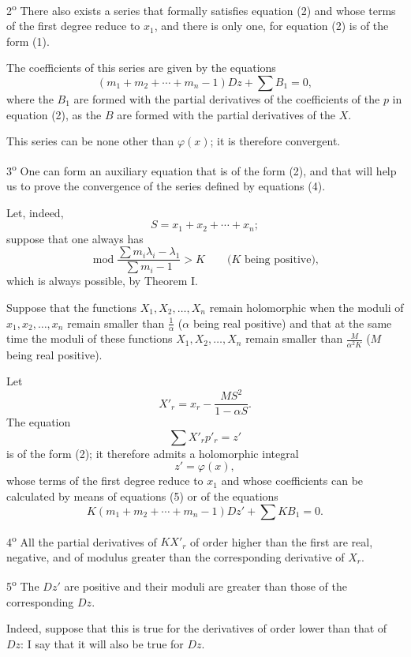 \documentclass[11pt]{article}
\begin{document}
2\textsuperscript{o} There also exists a series that formally satisfies equation (2) and whose terms of the first degree reduce to $x_1$, and there is only one, for equation (2) is of the form (1).

The coefficients of this series are given by the equations
\begin{equation*}\tag{5}
(m_1+m_2+\cdots+m_n-1)Dz+\sum B_1=0,
\end{equation*}
where the $B_1$ are formed with the partial derivatives of the coefficients of the $p$ in equation (2), as the $B$ are formed with the partial derivatives of the $X$.

This series can be none other than $\varphi(x)$; it is therefore convergent.

3\textsuperscript{o} One can form an auxiliary equation that is of the form (2), and that will help us to prove the convergence of the series defined by equations (4).

Let, indeed,
\[
S=x_1+x_2+\cdots+x_n;
\]
suppose that one always has
\[
\operatorname{mod}\frac{\sum m_i\lambda_i-\lambda_1}{\sum m_i-1}>K
\qquad\text{($K$ being positive)},
\]
which is always possible, by Theorem I.

Suppose that the functions $X_1,X_2,\ldots,X_n$ remain holomorphic when the moduli of $x_1,x_2,\ldots,x_n$ remain smaller than $\frac1\alpha$ ($\alpha$ being real positive) and that at the same time the moduli of these functions $X_1,X_2,\ldots,X_n$ remain smaller than $\frac{M}{\alpha^2K}$ ($M$ being real positive).

Let
\[
X'_r=x_r-\frac{MS^2}{1-\alpha S}.
\]
The equation
\[
\sum X'_rp'_r=z'
\]
is of the form (2); it therefore admits a holomorphic integral
\[
z'=\varphi(x),
\]
whose terms of the first degree reduce to $x_1$ and whose coefficients can be calculated by means of equations (5) or of the equations
\begin{equation*}\tag{5 bis}
K(m_1+m_2+\cdots+m_n-1)Dz'+\sum KB_1=0.
\end{equation*}

4\textsuperscript{o} All the partial derivatives of $KX'_r$ of order higher than the first are real, negative, and of modulus greater than the corresponding derivative of $X_r$.

5\textsuperscript{o} The $Dz'$ are positive and their moduli are greater than those of the corresponding $Dz$.

Indeed, suppose that this is true for the derivatives of order lower than that of $Dz$: I say that it will also be true for $Dz$.
\end{document}
